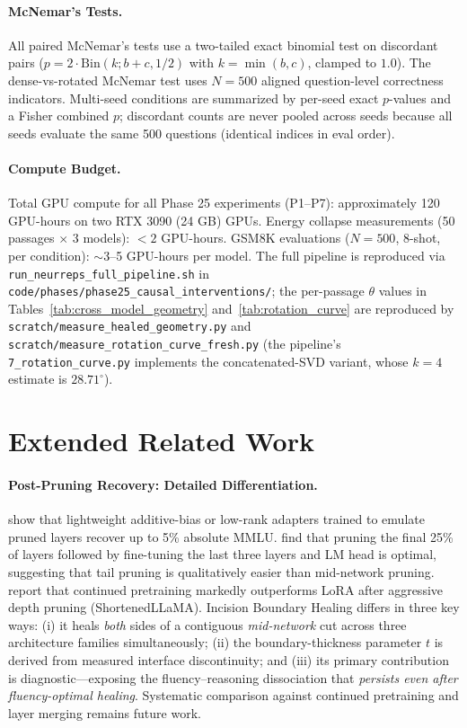 \documentclass[pmlr,onecolumn]{jmlr}
\begin{document}
{\paragraph{McNemar's Tests.}
All paired McNemar's tests use a two-tailed exact binomial test on discordant pairs ($p = 2 \cdot \mathrm{Bin}(k; b + c, 1/2)$ with $k = \min(b, c)$, clamped to $1.0$). The dense-vs-rotated McNemar test uses $N=500$ aligned question-level correctness indicators. Multi-seed conditions are summarized by per-seed exact $p$-values and a Fisher combined $p$; discordant counts are never pooled across seeds because all seeds evaluate the same 500 questions (identical indices in eval order).

\paragraph{Compute Budget.}
Total GPU compute for all Phase 25 experiments (P1--P7): approximately 120 GPU-hours on two RTX 3090 (24 GB) GPUs. Energy collapse measurements (50 passages $\times$ 3 models): $< 2$ GPU-hours. GSM8K evaluations ($N=500$, 8-shot, per condition): $\sim$3--5 GPU-hours per model. The full pipeline is reproduced via \texttt{run\_neurreps\_\allowbreak{}full\_pipeline.sh} in \texttt{code/phases/\allowbreak{}phase25\_causal\_\allowbreak{}interventions/}; the per-passage $\theta$ values in Tables~\ref{tab:cross_model_geometry} and~\ref{tab:rotation_curve} are reproduced by \texttt{scratch/measure\_healed\_geometry.py} and \texttt{scratch/measure\_rotation\_curve\_fresh.py} (the pipeline's \texttt{7\_rotation\_curve.py} implements the concatenated-SVD variant, whose $k{=}4$ estimate is $28.71^\circ$).


\section{Extended Related Work}
\label{app:related}

\paragraph{Post-Pruning Recovery: Detailed Differentiation.}
\citet{siddiqui2024deeper} show that lightweight additive-bias or low-rank adapters trained to emulate pruned layers recover up to 5\% absolute MMLU. \citet{yaolu2024reassessing} find that pruning the final 25\% of layers followed by fine-tuning the last three layers and LM head is optimal, suggesting that tail pruning is qualitatively easier than mid-network pruning. \citet{kim2024shortened} report that continued pretraining markedly outperforms LoRA after aggressive depth pruning (ShortenedLLaMA). Incision Boundary Healing differs in three key ways: (i) it heals \emph{both} sides of a contiguous \emph{mid-network} cut across three architecture families simultaneously; (ii) the boundary-thickness parameter $t$ is derived from measured interface discontinuity; and (iii) its primary contribution is diagnostic---exposing the fluency--reasoning dissociation that \emph{persists even after fluency-optimal healing}. Systematic comparison against continued pretraining \citep{kim2024shortened} and layer merging \citep{yang-etal-2024-laco} remains future work.

}
\end{document}
